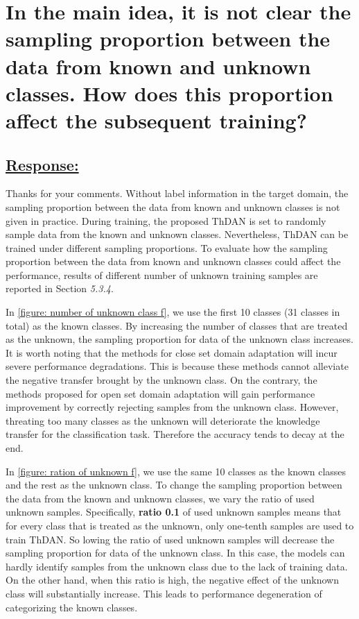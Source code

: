 \renewcommand\thesection{\Roman{section}}

\section{In the main idea, it is not clear the sampling proportion between the data from known and unknown classes. How does this proportion affect the subsequent training?}
\label{Question: class number}
\subsection*{\underline{\textbf{Response:}}}

Thanks for your comments.
Without label information in the target domain, the sampling proportion between the data from known and unknown classes is not given in practice. 
During training, the proposed ThDAN is set to randomly sample data from the known and unknown classes.
Nevertheless, ThDAN can be trained under different sampling proportions.
To evaluate how the sampling proportion between the data from known and unknown classes could affect the performance, results of different number of unknown training samples are reported in Section \textit{5.3.4}.


In \figurename{\ref{figure: number of unknown class f}}, we use the first 10 classes (31 classes in total) as the known classes.
By increasing the number of classes that are treated as the unknown, the sampling proportion for data of the unknown class increases.
It is worth noting that the methods for close set domain adaptation will incur severe performance degradations.
This is because these methods cannot alleviate the negative transfer brought by the unknown class.
On the contrary, the methods proposed for open set domain adaptation will gain performance improvement by correctly rejecting samples from the unknown class.
However, threating too many classes as the unknown will deteriorate the knowledge transfer for the classification task.
Therefore the accuracy tends to decay at the end.

In \figurename{\ref{figure: ration of unknown f}}, we use the same 10 classes as the known classes and the rest as the unknown class.
To change the sampling proportion between the data from the known and unknown classes, we vary the ratio of used unknown samples.
Specifically, \textbf{ratio 0.1} of used unknown samples means that for every class that is treated as the unknown, only one-tenth samples are used to train ThDAN. 
So lowing the ratio of used unknown samples will decrease the sampling proportion for data of the unknown class.
In this case, the models can hardly identify samples from the unknown class due to the lack of training data.
On the other hand, when this ratio is high, the negative effect of the unknown class will substantially increase.
This leads to performance degeneration of categorizing the known classes.

